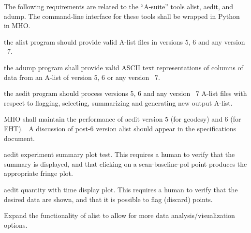 The following requirements are related to the ``A-suite'' tools alist, aedit,
and adump.  The command-line interface for these tools shall be wrapped
in Python in \acs{MHO}.

\begin{description}

 the \acs{alist} program should provide valid \acs{A-list}
    files in versions 5, 6 and any version \TBD~7.

 the \acs{adump} program shall provide valid ASCII text
    representations of columns of data from an \acs{A-list} of version
    5, 6 or any version \TBD~7.

 the \acs{aedit} program should process versions 5, 6 and
    any version \TBD~7 \acs{A-list} files with respect to flagging,
    selecting, summarizing and generating new output \acs{A-list}.



 \ac{MHO} shall maintain the performance of \acs{aedit} version
5 (for geodesy) and 6 (for EHT). \TBD~A discussion of post-6
version alist should appear in the specifications document.

 \acs{aedit} experiment summary plot test.  This requires a
    human to verify that the summary is displayed, and that clicking
    on a scan-baseline-pol point produces the appropriate fringe plot.

 \acs{aedit} quantity with time display plot.  This requires
    a human to verify that the desired data are shown, and that it
    is possible to flag (discard) points.

 Expand the functionality of \acs{alist} to allow for more data
    analysis/visualization options.


\end{description}
